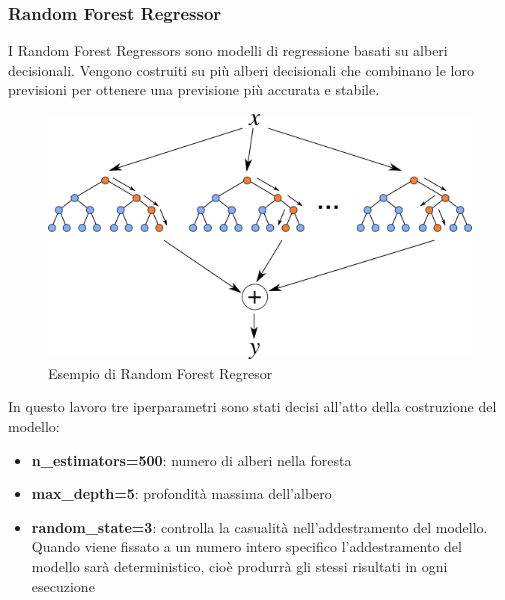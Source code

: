 \subsubsection{Random Forest Regressor}
I Random Forest Regressors sono modelli di regressione basati su alberi decisionali. Vengono costruiti su più alberi decisionali che combinano le loro previsioni per ottenere una previsione più accurata e stabile.
\begin{figure}[H]
    \centering
    \includegraphics[scale=0.5]{images/RandomForestRegressor.png}
    \caption{Esempio di Random Forest Regresor}
\end{figure}

\noindent In questo lavoro tre iperparametri sono stati decisi all'atto della costruzione del modello:
\begin{itemize}
    \item \textbf{n\_estimators=500}: numero di alberi nella foresta
    \item \textbf{max\_depth=5}: profondità massima dell'albero
    \item \textbf{random\_state=3}:  controlla la casualità nell'addestramento del modello. Quando viene fissato a un numero intero specifico l'addestramento del modello sarà deterministico, cioè produrrà gli stessi risultati in ogni esecuzione
\end{itemize}

